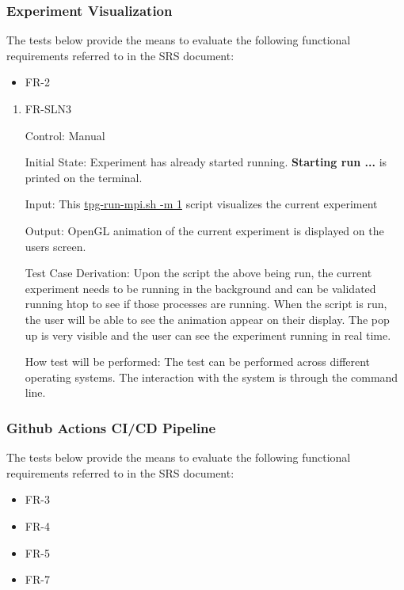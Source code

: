 \documentclass[12pt, titlepage]{article}
\begin{document}
\subsubsection{Experiment Visualization}
The tests below provide the means to evaluate the following functional requirements referred to in the SRS document:
\begin{itemize}
  \item FR-2
\end{itemize}

\begin{enumerate}
 \item{FR-SLN3}

  Control: Manual
          
  Initial State: Experiment has already started running. \textbf{Starting run ...} is printed on the terminal.
            
  Input: This \href{https://github.com/TPGEngine/tpg/blob/main/src/scripts/run/tpg-run-mpi.sh}{tpg-run-mpi.sh -m 1} script visualizes the current experiment
            
  Output: OpenGL animation of the current experiment is displayed on the users screen.

  Test Case Derivation: Upon the script the above being run, the current experiment needs to be running in the background and can be validated running htop to see if those processes are running. When the script is run, the user will be able to see the animation appear on their display. The pop up is very visible and the user can see the experiment running in real time.
            
  How test will be performed: The test can be performed across different operating systems. The interaction with the system is through the command line.

\end{enumerate}

\subsubsection{Github Actions CI/CD Pipeline}
The tests below provide the means to evaluate the following functional requirements referred to in the SRS document:
\begin{itemize}
  \item FR-3
  \item FR-4
  \item FR-5
  \item FR-7
\end{itemize}
\end{document}
